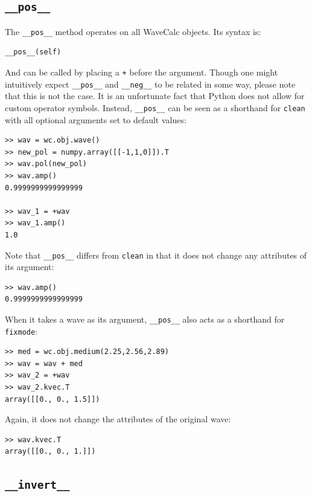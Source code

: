 \documentclass[11pt, reqno]{book}%
\newcounter{ct}
\newcommand{\tw}[1]{{\tt #1}}
\begin{document}
\subsection{\tw{\_\_pos\_\_} }
\label{sec:posmethod}

The \tw{\_\_pos\_\_} method operates on all WaveCalc objects. Its syntax is:
\begin{verbatim}
__pos__(self)
\end{verbatim}
\noindent And can be called by placing a \tw{+} before the argument. Though one might intuitively expect \tw{\_\_pos\_\_} and \tw{\_\_neg\_\_} to be related in some way, please note that this is not the case. It is an unfortunate fact that Python does not allow for custom operator symbols. Instead, \tw{\_\_pos\_\_} can be seen as a shorthand for \tw{clean} with all optional arguments set to default values:
\begin{verbatim}
>> wav = wc.obj.wave()
>> new_pol = numpy.array([[-1,1,0]]).T
>> wav.pol(new_pol)
>> wav.amp()
0.9999999999999999

>> wav_1 = +wav
>> wav_1.amp()
1.0
\end{verbatim}
\noindent Note that \tw{\_\_pos\_\_} differs from \tw{clean} in that it does not change any attributes of its argument:
\begin{verbatim}
>> wav.amp()
0.9999999999999999
\end{verbatim}
\noindent When it takes a wave as its argument, \tw{\_\_pos\_\_} also acts as a shorthand for \tw{fixmode}:
\begin{verbatim}
>> med = wc.obj.medium(2.25,2.56,2.89)
>> wav = wav + med
>> wav_2 = +wav
>> wav_2.kvec.T
array([[0., 0., 1.5]])
\end{verbatim}
\noindent Again, it does not change the attributes of the original wave:
\begin{verbatim}
>> wav.kvec.T
array([[0., 0., 1.]])
\end{verbatim}












\subsection{\tw{\_\_invert\_\_} }
\label{sec:invertmethod}
\end{document}

